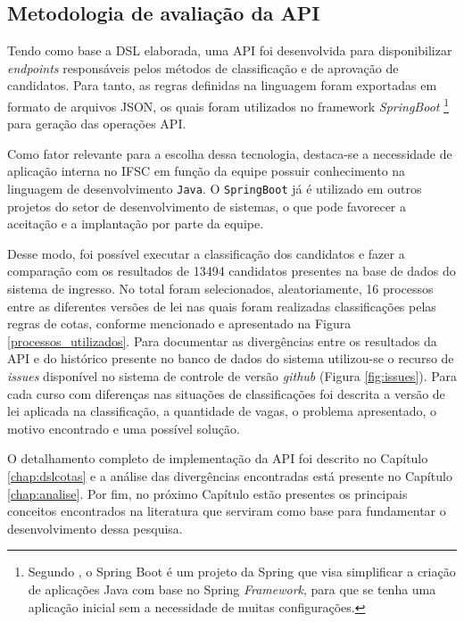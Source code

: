 \subsection{Metodologia de avaliação da API}
\label{metodoapi}
Tendo como base a DSL elaborada, uma \gls{API} foi desenvolvida para disponibilizar \textit{endpoints} responsáveis pelos métodos de classificação e de aprovação de candidatos. Para tanto, as regras definidas na linguagem foram exportadas em formato de arquivos JSON, os quais foram utilizados no framework \textit{SpringBoot} \footnote{Segundo , o Spring Boot é um projeto da Spring que visa simplificar a criação de aplicações Java com base no Spring \textit{Framework}, para que se tenha uma aplicação inicial sem a necessidade de muitas configurações.} para geração das operações \gls{API}. 

Como fator relevante para a escolha dessa tecnologia, destaca-se a necessidade de aplicação interna no \gls{IFSC} em função da equipe possuir conhecimento na linguagem de desenvolvimento \texttt{Java}. O \texttt{SpringBoot} já é utilizado em outros projetos do setor de desenvolvimento de sistemas, o que pode favorecer a aceitação e a implantação por parte da equipe.

Desse modo, foi possível executar a classificação dos candidatos e fazer a comparação com os resultados de 13494 candidatos presentes na base de dados do sistema de ingresso. No total foram selecionados, aleatoriamente, 16 processos entre as diferentes versões de lei nas quais foram realizadas classificações pelas regras de cotas, conforme mencionado e apresentado na Figura \ref{processos_utilizados}. Para documentar as divergências entre os resultados da \gls{API} e do histórico presente no banco de dados do sistema utilizou-se o recurso de \textit{issues} disponível no sistema de controle de versão \textit{github} (Figura \ref{fig:issues}). Para cada curso com diferenças nas situações de classificações foi descrita a versão de lei aplicada na classificação, a quantidade de vagas, o problema apresentado, o motivo encontrado e uma possível solução.



\newpage
O detalhamento completo de implementação da \gls{API} foi descrito no Capítulo \ref{chap:dslcotas} e a análise das divergências encontradas está presente no Capítulo \ref{chap:analise}. Por fim, no próximo Capítulo estão presentes os principais conceitos encontrados na literatura que serviram como base para fundamentar o desenvolvimento dessa pesquisa.